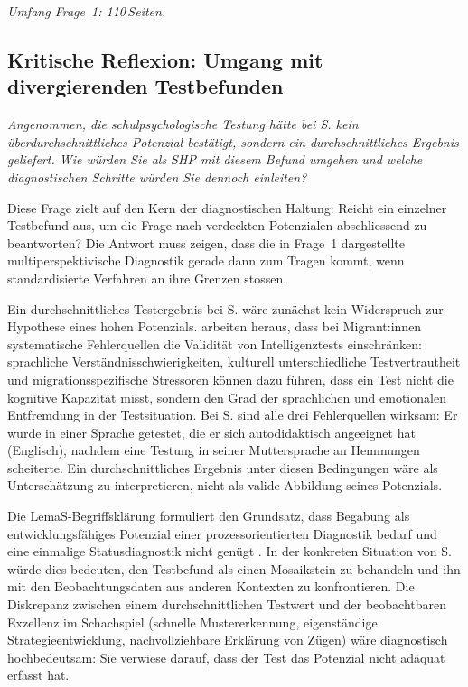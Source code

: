 \documentclass[ngerman, a4paper]{article}
\begin{document}
\textit{Umfang Frage~1: 110\,Seiten.}
 

 

\subsection{Kritische Reflexion: Umgang mit divergierenden Testbefunden}


\begin{tcolorbox}[colback=gray!5, colframe=gray!50, title=Weiterführende Diskurslinie]
\itshape
Angenommen, die schulpsychologische Testung hätte bei S. kein überdurchschnittliches
Potenzial bestätigt, sondern ein durchschnittliches Ergebnis geliefert. Wie würden Sie
als SHP mit diesem Befund umgehen und welche diagnostischen Schritte würden Sie
dennoch einleiten?
\end{tcolorbox}

Diese Frage zielt auf den Kern der diagnostischen Haltung: Reicht ein einzelner
Testbefund aus, um die Frage nach verdeckten Potenzialen abschliessend zu beantworten?
Die Antwort muss zeigen, dass die in Frage~1 dargestellte multiperspektivische
Diagnostik gerade dann zum Tragen kommt, wenn standardisierte Verfahren an ihre
Grenzen stossen.

Ein durchschnittliches Testergebnis bei S. wäre zunächst kein Widerspruch zur
Hypothese eines hohen Potenzials. \textcite[Kap.\,1--2]{maehler2018diagnostik} arbeiten heraus, dass bei
Migrant:innen systematische Fehlerquellen die Validität von Intelligenztests
einschränken: sprachliche Verständnisschwierigkeiten, kulturell unterschiedliche
Testvertrautheit und migrationsspezifische Stressoren können dazu führen, dass ein
Test nicht die kognitive Kapazität misst, sondern den Grad der sprachlichen und
emotionalen Entfremdung in der Testsituation. Bei S. sind alle drei Fehlerquellen
wirksam: Er wurde in einer Sprache getestet, die er sich autodidaktisch angeeignet
hat (Englisch), nachdem eine Testung in seiner Muttersprache an Hemmungen scheiterte.
Ein durchschnittliches Ergebnis unter diesen Bedingungen wäre als Unterschätzung zu
interpretieren, nicht als valide Abbildung seines Potenzials.

Die LemaS-Begriffsklärung formuliert den Grundsatz, dass Begabung als
entwicklungsfähiges Potenzial einer prozessorientierten Diagnostik bedarf und eine
einmalige Statusdiagnostik nicht genügt \parencite{lemas2023begriffsklaerung}. In
der konkreten Situation von S. würde dies bedeuten, den Testbefund als einen
Mosaikstein zu behandeln und ihn mit den Beobachtungsdaten aus anderen Kontexten
zu konfrontieren. Die Diskrepanz zwischen einem durchschnittlichen Testwert und der
beobachtbaren Exzellenz im Schachspiel (schnelle Mustererkennung, eigenständige
Strategieentwicklung, nachvollziehbare Erklärung von Zügen) wäre diagnostisch
hochbedeutsam: Sie verwiese darauf, dass der Test das Potenzial nicht adäquat
erfasst hat.
\end{document}
